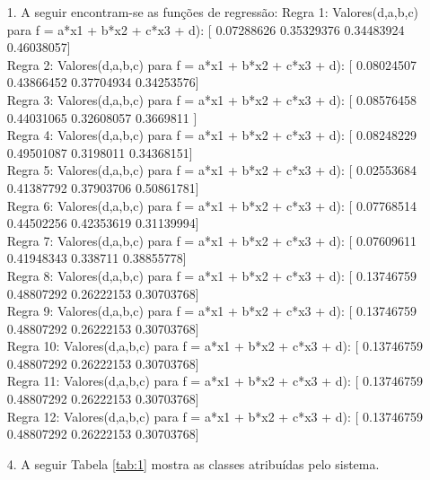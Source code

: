 \documentclass{report}
\begin{document}
\begin{enumerate}
\item[1.]
    A seguir encontram-se as funções de regressão:
Regra 1: Valores(d,a,b,c) para f = a*x1 + b*x2 + c*x3 + d): [ 0.07288626  0.35329376  0.34483924  0.46038057] \\
Regra 2: Valores(d,a,b,c) para f = a*x1 + b*x2 + c*x3 + d): [ 0.08024507  0.43866452  0.37704934  0.34253576] \\
Regra 3: Valores(d,a,b,c) para f = a*x1 + b*x2 + c*x3 + d): [ 0.08576458  0.44031065  0.32608057  0.3669811 ] \\
Regra 4: Valores(d,a,b,c) para f = a*x1 + b*x2 + c*x3 + d): [ 0.08248229  0.49501087  0.3198011   0.34368151] \\
Regra 5: Valores(d,a,b,c) para f = a*x1 + b*x2 + c*x3 + d): [ 0.02553684  0.41387792  0.37903706  0.50861781] \\
Regra 6: Valores(d,a,b,c) para f = a*x1 + b*x2 + c*x3 + d): [ 0.07768514  0.44502256  0.42353619  0.31139994] \\
Regra 7: Valores(d,a,b,c) para f = a*x1 + b*x2 + c*x3 + d): [ 0.07609611  0.41948343  0.338711    0.38855778] \\
Regra 8: Valores(d,a,b,c) para f = a*x1 + b*x2 + c*x3 + d): [ 0.13746759  0.48807292  0.26222153  0.30703768] \\
Regra 9: Valores(d,a,b,c) para f = a*x1 + b*x2 + c*x3 + d): [ 0.13746759  0.48807292  0.26222153  0.30703768] \\
Regra 10: Valores(d,a,b,c) para f = a*x1 + b*x2 + c*x3 + d): [ 0.13746759  0.48807292  0.26222153  0.30703768] \\
Regra 11: Valores(d,a,b,c) para f = a*x1 + b*x2 + c*x3 + d): [ 0.13746759  0.48807292  0.26222153  0.30703768] \\
Regra 12: Valores(d,a,b,c) para f = a*x1 + b*x2 + c*x3 + d): [ 0.13746759  0.48807292  0.26222153  0.30703768] \\

\item[4.]
 A seguir Tabela \ref{tab:1} mostra as classes atribuídas pelo sistema.


\end{enumerate}
\end{document}
